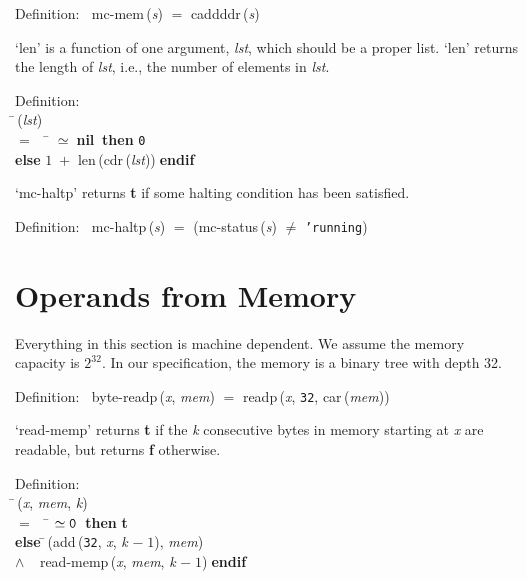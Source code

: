 \begin{tabbing}{\sc Definition}:$\;\;$
{\rm{mc-mem}}\,({\it{s\/}}) $=$ {\rm{caddddr}}\,({\it{s\/}})
\end{tabbing}

 `len' is a function of one argument, {\it{lst\/}}, which should be a proper list.
 `len' returns the length of {\it{lst\/}}, i.e., the number of elements in {\it{lst\/}}.
\begin{tabbing}{\sc Definition}: \\  
\=\,({\it{lst\/}}) \\ 
$=$$\;\;\;\;$\= $\simeq\;${{\bf{nil}}}${}$$\;\;${\bf then }{\tt{0}} \\ 
{\bf else }$1\;+$ {\rm{len}}\,({\rm{cdr}}\,({\it{lst\/}}))$\;${\bf  endif}\-\-
\end{tabbing}

 `mc-haltp' returns {\bf{t}} if some halting condition has been satisfied.
\begin{tabbing}{\sc Definition}:$\;\;$
{\rm{mc-haltp}}\,({\it{s\/}}) $=$ ({\rm{mc-status}}\,({\it{s\/}}) $\not=$ {\tt{'}}{\tt{running}})
\end{tabbing}


 \section{Operands from Memory}

 Everything in this section is machine dependent.  We assume the memory
 capacity is $2^{32}$.  In our specification, the memory is a binary tree
 with depth 32.
\begin{tabbing}{\sc Definition}:$\;\;$
{\rm{byte-readp}}\,({\it{x\/}}, {\it{mem\/}}) $=$ {\rm{readp}}\,({\it{x\/}}, {\tt{32}}, {\rm{car}}\,({\it{mem\/}}))
\end{tabbing}

 `read-memp' returns {\bf{t}} if the {\it{k\/}} consecutive bytes in memory starting
 at {\it{x\/}} are readable, but returns {\bf{f}} otherwise.
\begin{tabbing}{\sc Definition}: \\  
\=\,({\it{x\/}}, {\it{mem\/}}, {\it{k\/}}) \\ 
$=$$\;\;\;\;$\= $\simeq {\tt{0}}$$\;\;${\bf then }{\bf{t}} \\ 
{\bf else }\=\,({\rm{add}}\,({\tt{32}}, {\it{x\/}}, {\it{k\/}} $-\;1$), {\it{mem\/}}) \\ 
$\wedge$$\;\;\;\;${\rm{read-memp}}\,({\it{x\/}}, {\it{mem\/}}, {\it{k\/}} $-\;1$)\-$\;${\bf  endif}\-\-
\end{tabbing}

